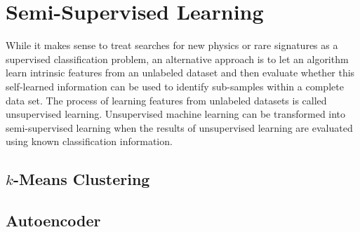 \section{Semi-Supervised Learning}
\label{sec:semisupervised}
While it makes sense to treat searches for new physics or rare signatures as a supervised classification problem, an alternative approach is to let an algorithm learn intrinsic features from an unlabeled dataset and then evaluate whether this self-learned information can be used to identify sub-samples within a complete data set. The process of learning features from unlabeled datasets is called unsupervised learning. Unsupervised machine learning can be transformed into semi-supervised learning when the results of unsupervised learning are evaluated using known classification information.

\subsection{$k$-Means Clustering}


\subsection{Autoencoder}

